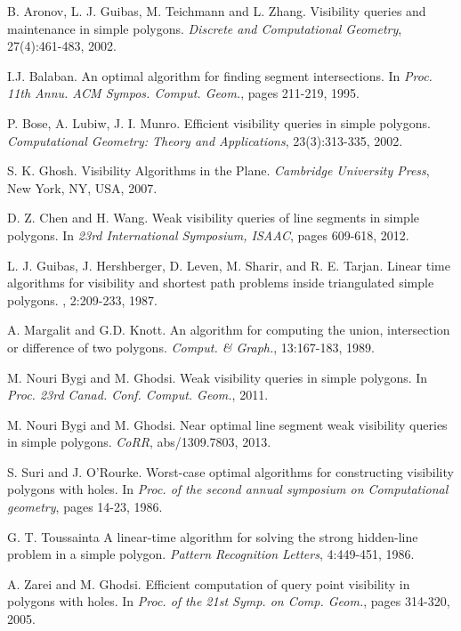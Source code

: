 \documentclass[5p]{elsarticle}
\begin{document}
\begin{thebibliography}{99}





  B. Aronov, L. J. Guibas, M. Teichmann and L. Zhang.
Visibility queries and maintenance in simple polygons.
{\em Discrete and Computational Geometry}, 27(4):461-483,
2002.

I.J. Balaban. An optimal algorithm for finding segment intersections. In {\em Proc. 11th
Annu. ACM Sympos. Comput. Geom.}, pages 211-219, 1995.



 P. Bose, A. Lubiw, J. I. Munro. Efficient visibility
queries in simple polygons. {\em Computational Geometry:
Theory and Applications}, 23(3):313-335, 2002.


S. K. Ghosh. 
Visibility Algorithms in the Plane.
{\em Cambridge University Press}, New York, NY, USA, 2007.

 D. Z. Chen and H. Wang. Weak visibility queries of line segments in simple polygons.
In {\em 23rd International Symposium, ISAAC}, pages 609-618, 2012.


L. J. Guibas, J. Hershberger, D. Leven, M. Sharir, and R. E. Tarjan.
\newblock  Linear time algorithms for visibility and shortest path problems inside triangulated simple polygons.
, 2:209-233, 1987.

A. Margalit and G.D. Knott. An algorithm for computing the union, intersection or
difference of two polygons. {\em Comput. \& Graph.}, 13:167-183, 1989.


M. Nouri Bygi and M. Ghodsi.
Weak visibility queries in simple polygons.
In {\em Proc. 23rd Canad. Conf. Comput. Geom.}, 2011.

M. Nouri Bygi and M. Ghodsi.
Near optimal line segment weak visibility queries in simple polygons.
{\em CoRR}, abs/1309.7803, 2013.


S. Suri and J. O'Rourke.
Worst-case optimal algorithms for constructing visibility polygons with holes.
In {\em Proc. of the second annual symposium on Computational geometry}, pages 14-23, 1986.

G. T. Toussainta
A linear-time algorithm for solving the strong hidden-line problem in a simple polygon.
{\em Pattern Recognition Letters}, 4:449-451, 1986.

A. Zarei and M. Ghodsi.
Efficient computation of query point visibility in polygons with holes.
In {\em Proc. of the 21st Symp. on Comp. Geom.}, pages 314-320, 2005.


\end{thebibliography}
  
  
\end{document}
